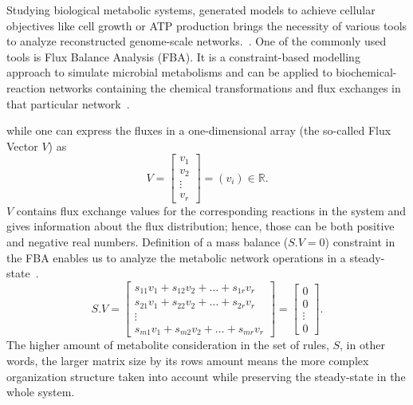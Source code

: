 Studying biological metabolic systems, generated models to achieve cellular objectives like cell growth or ATP production brings the necessity of various tools to analyze reconstructed genome-scale networks.~\cite{KIM, HAO}. One of the commonly used tools is Flux Balance Analysis (FBA). It is a constraint-based modelling approach to simulate microbial metabolisms and can be applied to biochemical-reaction networks containing the chemical transformations and flux exchanges in that particular network~\cite{KAUFFMAN2003491, PRICE2004}.

while one can express the fluxes in a one-dimensional array (the so-called Flux Vector $V$) as 
\begin{equation} \tag{2}
	V = \begin{bmatrix}
		v_{1} \\
		v_{2} \\
		\vdots \\
		v_{r}
	\end{bmatrix}=(v_{i})\in \mathbb{R}.
	\label{solutionvector}
\end{equation}
$V$ contains flux exchange values for the corresponding reactions in the system and gives information about the flux distribution; hence, those can be both positive and negative real numbers. Definition of a mass balance ($S.V=0$) constraint in the FBA enables us to analyze the metabolic network operations in a steady-state~\cite{KAUFFMAN2003491,PRICE2004}.
\begin{equation} \tag{3}
	S.V = \begin{bmatrix} 
		s_{11}v_{1} + s_{12}v_{2} + \dots + s_{1r}v_{r} \\
		s_{21}v_{1} + s_{22}v_{2} + \dots + s_{2r}v_{r} \\
		\vdots \\
		s_{m1}v_{1} + s_{m2}v_{2} + \dots + s_{mr}v_{r} 
	\end{bmatrix}=
	\begin{bmatrix} 
		0 \\
		0 \\
		\vdots \\
		0
	\end{bmatrix}.
	\label{massbalanceconstraint}
\end{equation}
The higher amount of metabolite consideration in the set of rules, $S$, in other words, the larger matrix size by its rows amount means the more complex organization structure taken into account while preserving the steady-state in the whole system.


